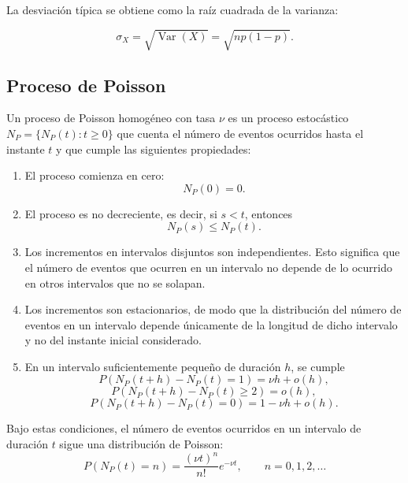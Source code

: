\documentclass[12pt,a4paper]{article}
\begin{document}
La desviación típica se obtiene como la raíz cuadrada de la varianza:

\begin{equation}
    \sigma_X
    =
    \sqrt{\operatorname{Var}(X)}
    =
    \sqrt{np(1-p)}.
    \label{eq:ap_desviacion_tipica_binomial}
\end{equation}


\subsection{Proceso de Poisson}
\label{ap:proceso_poisson}

\begin{cajadefinicion}
  Un proceso de Poisson homogéneo con tasa $\nu$ es un proceso estocástico $N_P=\{N_P(t):t\geq 0\}$ que cuenta el número de eventos ocurridos hasta el instante $t$ y que cumple las siguientes propiedades:

  \begin{enumerate}
    \item El proceso comienza en cero:
    \begin{equation}
        N_P(0)=0.
    \end{equation}

    \item El proceso es no decreciente, es decir, si $s<t$, entonces
    \begin{equation}
        N_P(s)\leq N_P(t).
    \end{equation}

    \item Los incrementos en intervalos disjuntos son independientes. Esto significa que el número de eventos que ocurren en un intervalo no depende de lo ocurrido en otros intervalos que no se solapan.

    \item Los incrementos son estacionarios, de modo que la distribución del número de eventos en un intervalo depende únicamente de la longitud de dicho intervalo y no del instante inicial considerado.

    \item En un intervalo suficientemente pequeño de duración $h$, se cumple
    \begin{equation}
        P(N_P(t+h)-N_P(t)=1)=\nu h+o(h),
    \end{equation}
    \begin{equation}
        P(N_P(t+h)-N_P(t)\geq 2)=o(h),
    \end{equation}
    \begin{equation}
        P(N_P(t+h)-N_P(t)=0)=1-\nu h+o(h).
    \end{equation}
  \end{enumerate}

  Bajo estas condiciones, el número de eventos ocurridos en un intervalo de duración $t$ sigue una distribución de Poisson:
  \begin{equation}
      P(N_P(t)=n)=\frac{(\nu t)^n}{n!}e^{-\nu t},
      \qquad n=0,1,2,\ldots
  \end{equation}
\end{cajadefinicion}
\end{document}

